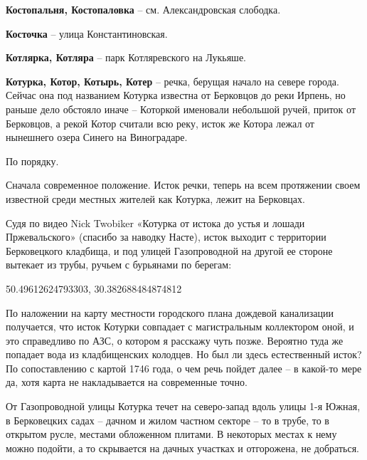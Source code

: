 \medskip

\textbf{Костопальня, Костопаловка} – см.  Александровская слободка.\\

\medskip

\textbf{Косточка} – улица Константиновская.\\

\medskip



\textbf{Котлярка, Котляра} – парк Котляревского на Лукьяше.\\

\medskip

\textbf{Котурка, Котор, Котырь, Котер} – речка, берущая начало на севере города. Сейчас она под названием Котурка известна от Берковцов до реки Ирпень, но раньше дело обстояло иначе – Которкой именовали небольшой ручей, приток от Берковцов, а рекой Котор считали всю реку, исток же Котора лежал от нынешнего озера Синего на Виноградаре.

По порядку.

Сначала современное положение. Исток речки, теперь на всем протяжении своем известной среди местных жителей как Котурка, лежит на 
Берковцах.

Судя по видео Nick Twobiker «Котурка от истока до устья и лошади Пржевальского» (спасибо за наводку Насте), исток выходит с территории Берковецкого кладбища, и под улицей Газопроводной на другой ее стороне вытекает из трубы, ручьем с бурьянами по берегам: 

50.49612624793303, 30.382688484874812

По наложении на карту местности городского плана дождевой канализации получается, что исток Котурки совпадает с магистральным коллектором оной, и это справедливо по АЗС, о котором я расскажу чуть позже. Вероятно туда же попадает вода из кладбищенских колодцев. Но был ли здесь естественный исток? По сопоставлению с картой 1746 года, о чем речь пойдет далее – в какой-то мере да, хотя карта не накладывается на современные точно. 

От Газопроводной улицы Котурка течет на северо-запад вдоль улицы 1-я Южная, в Берковецких садах – дачном и жилом частном секторе – то в трубе, то в открытом русле, местами обложенном плитами. В некоторых местах к нему можно подойти, а то скрывается на дачных участках и отгорожена, не добраться.

